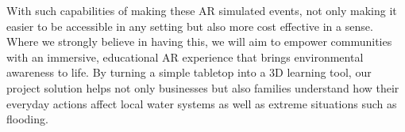 With such capabilities of making these AR simulated events, not only making it easier to be accessible in any setting but also more cost effective in a sense. Where we strongly believe in having this, we will aim to empower communities with an immersive, educational AR experience that brings environmental awareness to life. By turning a simple tabletop into a 3D learning tool, our project solution helps not only businesses but also families understand how their everyday actions affect local water systems as well as extreme situations such as flooding. 